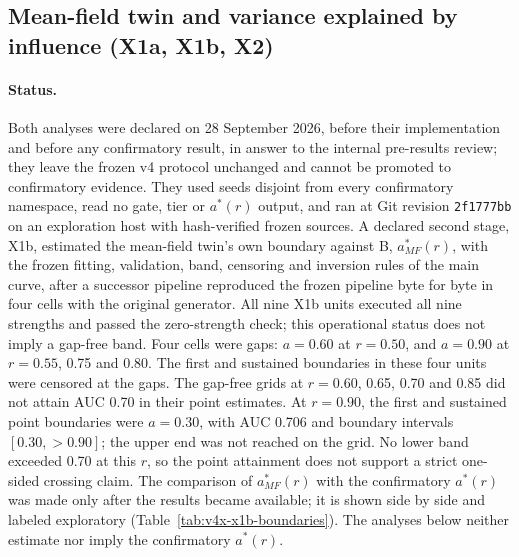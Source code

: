 
\subsection{Mean-field twin and variance explained by influence (X1a, X1b, X2)}\label{sec:x1-x2}\label{supp:x1-x2}

\paragraph{Status.}
Both analyses were declared on 28 September 2026, before their implementation and before any confirmatory result, in answer to the internal pre-results review; they leave the frozen v4 protocol unchanged and cannot be promoted to confirmatory evidence. %
They used seeds disjoint from every confirmatory namespace, read no gate, tier or $a^*(r)$ output, and ran at Git revision \texttt{2f1777bb} on an exploration host with hash-verified frozen sources. %
A declared second stage, X1b, estimated the mean-field twin's own boundary against B, $a^*_{MF}(r)$, with the frozen fitting, validation, band, censoring and inversion rules of the main curve, after a successor pipeline reproduced the frozen pipeline byte for byte in four cells with the original generator. %
All nine X1b units executed all nine strengths and passed the zero-strength check; this operational status does not imply a gap-free band. %
Four cells were gaps: $a=0.60$ at $r=0.50$, and $a=0.90$ at $r=0.55$, 0.75 and 0.80. %
The first and sustained boundaries in these four units were censored at the gaps. %
The gap-free grids at $r=0.60$, 0.65, 0.70 and 0.85 did not attain AUC 0.70 in their point estimates. %
At $r=0.90$, the first and sustained point boundaries were $a=0.30$, with AUC 0.706 and boundary intervals $[0.30,>0.90]$; the upper end was not reached on the grid. %
No lower band exceeded 0.70 at this $r$, so the point attainment does not support a strict one-sided crossing claim. %
The comparison of $a^*_{MF}(r)$ with the confirmatory $a^*(r)$ was made only after the results became available; it is shown side by side and labeled exploratory (Table~\ref{tab:v4x-x1b-boundaries}). %
The analyses below neither estimate nor imply the confirmatory $a^*(r)$. %

